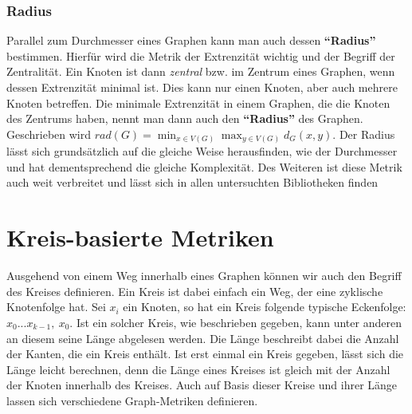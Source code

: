 \documentclass[a4paper,12pt,ngerman,chapterprefix=false,listof=totoc,bibliography=totoc]{scrreprt}
\begin{document}
{\subsubsection*{Radius}
{
Parallel zum Durchmesser eines Graphen kann man auch dessen \textbf{"`Radius"'} bestimmen. Hierfür wird die Metrik der Extrenzität wichtig und der Begriff der Zentralität. Ein Knoten ist dann \textit{zentral} bzw. im Zentrum eines Graphen, wenn dessen Extrenzität minimal ist. Dies kann nur einen Knoten, aber auch mehrere Knoten betreffen. Die minimale Extrenzität in einem Graphen, die die Knoten des Zentrums haben, nennt man dann auch den \textbf{"`Radius"'} des Graphen. Geschrieben wird \(rad(G) = \min_{x\in V(G)}\max_{y\in V(G)}d_G(x,y)\). \cite{diestel_graphentheorie_2000} Der Radius lässt sich grundsätzlich auf die gleiche Weise herausfinden, wie der Durchmesser und hat dementsprechend die gleiche Komplexität. Des Weiteren ist diese Metrik auch weit verbreitet und lässt sich in allen untersuchten Bibliotheken finden \cite{sagemath_graph_2020,wolfram_graph_2020,matlab_shortest_2020}
}
}
\section{Kreis-basierte Metriken}
{
Ausgehend von einem Weg innerhalb eines Graphen können wir auch den Begriff des Kreises definieren. Ein Kreis ist dabei einfach ein Weg, der eine zyklische Knotenfolge hat. Sei \(x_i\) ein Knoten, so hat ein Kreis folgende typische Eckenfolge: \(x_0...x_{k-1},\ x_0\). Ist ein solcher Kreis, wie beschrieben gegeben, kann unter anderen an diesem seine Länge abgelesen werden. Die Länge beschreibt dabei die Anzahl der Kanten, die ein Kreis enthält. Ist erst einmal ein Kreis gegeben, lässt sich die Länge leicht berechnen, denn die Länge eines Kreises ist gleich mit der Anzahl der Knoten innerhalb des Kreises. \cite{diestel_graphentheorie_2000} Auch auf Basis dieser Kreise und ihrer Länge lassen sich verschiedene Graph-Metriken definieren.
}
\end{document}
